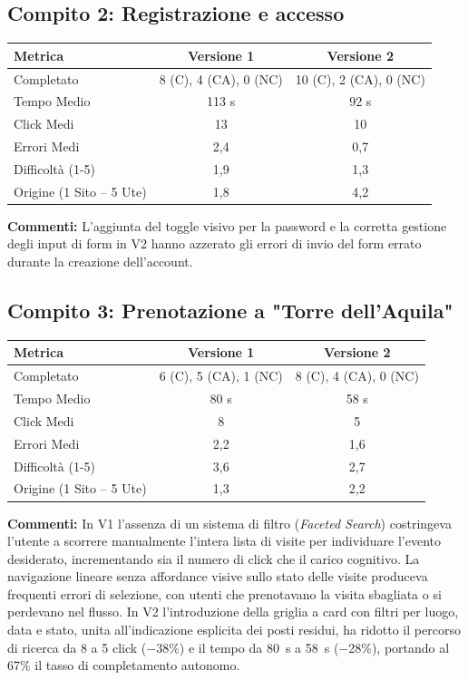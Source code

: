 \subsection{Compito 2: Registrazione e accesso}
\begin{table}[H]
\centering
\renewcommand{\arraystretch}{1.2}
\small
\begin{tabular}{|l|c|c|}
\hline
\textbf{Metrica} & \textbf{Versione 1} & \textbf{Versione 2} \\
\hline
Completato & 8 (C), 4 (CA), 0 (NC) & 10 (C), 2 (CA), 0 (NC) \\ \hline
Tempo Medio & 113 s & 92 s \\ \hline
Click Medi & 13 & 10 \\ \hline
Errori Medi & 2,4 & 0,7 \\ \hline
Difficoltà (1-5) & 1,9 & 1,3 \\ \hline
Origine (1 Sito -- 5 Ute) & 1,8 & 4,2 \\ \hline
\end{tabular}
\end{table}
\textbf{Commenti:} L'aggiunta del toggle visivo per la password e la corretta gestione degli input di form in V2 hanno azzerato gli errori di invio del form errato durante la creazione dell'account.

\subsection{Compito 3: Prenotazione a "Torre dell'Aquila"}
\begin{table}[H]
\centering
\renewcommand{\arraystretch}{1.2}
\small
\begin{tabular}{|l|c|c|}
\hline
\textbf{Metrica} & \textbf{Versione 1} & \textbf{Versione 2} \\
\hline
Completato & 6 (C), 5 (CA), 1 (NC) & 8 (C), 4 (CA), 0 (NC) \\ \hline
Tempo Medio & 80 s & 58 s \\ \hline
Click Medi & 8 & 5 \\ \hline
Errori Medi & 2,2 & 1,6 \\ \hline
Difficoltà (1-5) & 3,6 & 2,7 \\ \hline
Origine (1 Sito -- 5 Ute) & 1,3 & 2,2 \\ \hline
\end{tabular}
\end{table}
\textbf{Commenti:} In V1 l'assenza di un sistema di filtro (\textit{Faceted Search}) costringeva l'utente a scorrere manualmente l'intera lista di visite per individuare l'evento desiderato, incrementando sia il numero di click che il carico cognitivo. La navigazione lineare senza affordance visive sullo stato delle visite produceva frequenti errori di selezione, con utenti che prenotavano la visita sbagliata o si perdevano nel flusso. In V2 l'introduzione della griglia a card con filtri per luogo, data e stato, unita all'indicazione esplicita dei posti residui, ha ridotto il percorso di ricerca da 8 a 5 click ($-$38\%) e il tempo da 80~s a 58~s ($-$28\%), portando al 67\% il tasso di completamento autonomo.

